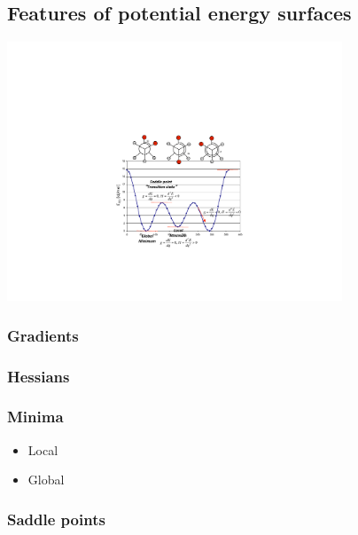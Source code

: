 \documentclass[11pt]{article}
\begin{document}
\subsection{Features of potential energy surfaces}
\label{sec:org246821e}
\begin{center}
\begin{center}
\includegraphics[width=0.75\textwidth]{./Images/PES.pdf}
\end{center}
\end{center}

\subsubsection{Gradients}
\label{sec:org96bd11c}

\subsubsection{Hessians}
\label{sec:org5a4251b}

\subsubsection{Minima}
\label{sec:org1e2ee6f}

\begin{itemize}
\item Local
\label{sec:orgd118f41}

\item Global
\label{sec:org821329e}
\end{itemize}

\subsubsection{Saddle points}
\label{sec:org88b71a0}
\end{document}
